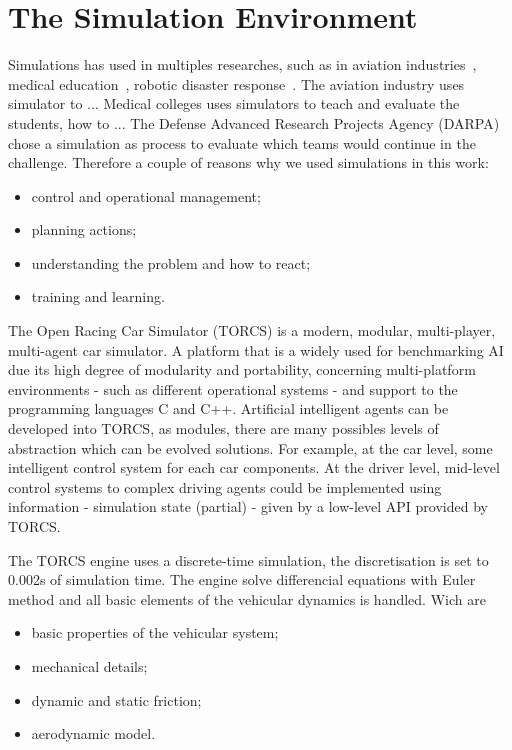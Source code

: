 \section{\textbf{The Simulation Environment}} \label{sec:Environment}


	Simulations has used in multiples researches, such as in aviation industries~\cite{aviation}, medical education~\cite{medical}, robotic disaster response~\cite{VRC}. The aviation industry uses simulator to ... Medical colleges uses simulators to teach and evaluate the students, how to ... The Defense Advanced Research Projects Agency (DARPA) chose a simulation as process to evaluate which teams would continue in the challenge. Therefore a couple of reasons why we used simulations in this work:
	\begin{itemize}
		\item control and operational management;
		\item planning actions;
		\item understanding the problem and how to react;
		\item training and learning.
	\end{itemize}


	The Open Racing Car Simulator (TORCS) is a modern, modular, multi-player, multi-agent car simulator. A platform that is a widely used for benchmarking AI due its high degree of modularity and portability, concerning multi-platform environments - such as different operational systems - and support to the programming languages C and C++. Artificial intelligent agents can be developed into TORCS, as modules, there are many possibles levels of abstraction which can be evolved solutions. For example, at the car level, some intelligent control system for each car components. At the driver level, mid-level control systems to complex driving agents could be implemented using information - simulation state (partial) - given by a low-level API provided by TORCS.~\cite{TORCS}


	The TORCS engine uses a discrete-time simulation, the discretisation is set to 0.002s of simulation time. The engine solve differencial equations with Euler method and all basic elements of the vehicular dynamics is handled. Wich are

	\begin{itemize}
		\item basic properties of the vehicular system;
		\item mechanical details;
		\item dynamic and static friction;
		\item aerodynamic model.
	\end{itemize}

